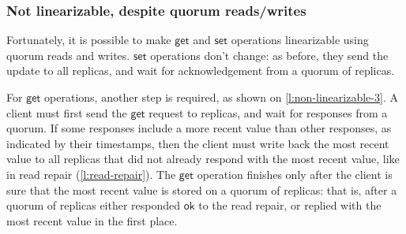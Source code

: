 \begin{frame}
    \label{s:non-linearizable-2}
    \frametitle{Not linearizable, despite quorum reads/writes}
\end{frame}
\label{l:non-linearizable-2}

Fortunately, it is possible to make $\mathsf{get}$ and $\mathsf{set}$ operations linearizable using quorum reads and writes.
$\mathsf{set}$ operations don't change: as before, they send the update to all replicas, and wait for acknowledgement from a quorum of replicas.

For $\mathsf{get}$ operations, another step is required, as shown on \autoref{l:non-linearizable-3}.
A client must first send the $\mathsf{get}$ request to replicas, and wait for responses from a quorum.
If some responses include a more recent value than other responses, as indicated by their timestamps, then the client must write back the most recent value to all replicas that did not already respond with the most recent value, like in read repair (\autoref{l:read-repair}).
The $\mathsf{get}$ operation finishes only after the client is sure that the most recent value is stored on a quorum of replicas: that is, after a quorum of replicas either responded $\mathsf{ok}$ to the read repair, or replied with the most recent value in the first place.

